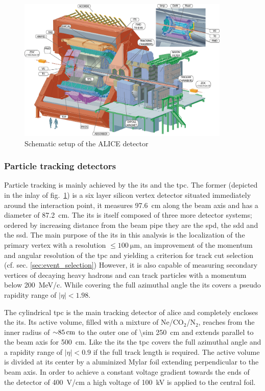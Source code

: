 \begin{figure}
  \centering
  \includegraphics[width=0.9\textwidth]{figures/2012-Aug-02-ALICE_3D_v0_with_Text.jpg}
  \caption[Schematic setup of the ALICE detector.]{Schematic setup of the ALICE detector \cite{alice_3d}}
  \label{fig:alice_scheme}
\end{figure}

\subsubsection{Particle tracking detectors}
\label{sec:tracking_detectors}
Particle tracking is mainly achieved by the \gls{its} and the \gls{tpc}. The former (depicted in the inlay of fig.~\ref{fig:alice_scheme}) is a six layer silicon vertex detector situated immediately around the interaction point, it measures \SI{97.6}{cm} along the beam axis and has a diameter of \SI{87.2}{cm}. The \gls{its} is itself composed of three more detector systems; ordered by increasing distance from the beam pipe they are the \gls{spd}, the \gls{sdd} and the \gls{ssd}. The main purpose of the \gls{its} in this analysis is the localization of the primary vertex with a resolution $\le \SI{100}{\micro \meter}$, an improvement of the momentum and angular resolution of the \gls{tpc} and yielding a criterion for track cut selection (cf. sec. \ref{sec:event_selection}) However, it is also capable of measuring secondary vertices of decaying heavy hadrons and can track particles with a momentum below \SI{200}{MeV/c}. While covering the full azimuthal angle the \gls{its} covers a pseudo rapidity range of $ |\eta |< 1.98$.

The cylindrical \gls{tpc} is the main tracking detector of \gls{alice} and completely encloses the \gls{its}. Its active volume, filled with a mixture of Ne/CO$_2$/N$_2$, reaches from the inner radius of  $\SI{\sim 85}{cm}$ to the outer one of \SI{\sim 250}{cm} and extends parallel to the beam axis for \SI{500}{cm}. Like the \gls{its} the \gls{tpc} covers the full azimuthal angle and a rapidity range of $|\eta | < 0.9$ if the full track length is required. 
The active volume is divided at its center by a aluminized Mylar foil extending perpendicular to the beam axis. In order to achieve a constant voltage gradient towards the ends of the detector of \SI{400}{V/cm} a high voltage of \SI{100}{kV} is applied to the central foil.

